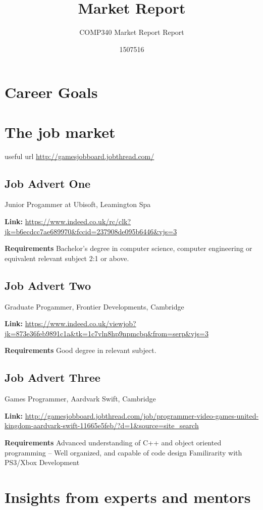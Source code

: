\documentclass{scrartcl}
\title{Market Report}
\subtitle{COMP340 Market Report Report}
\author{1507516}
\begin{document}
\maketitle


\section{Career Goals}


\section{The job market}


useful url \url{http://gamesjobboard.jobthread.com/}
\subsection{Job Advert One}
Junior Progammer at Ubisoft, Leamington Spa

\textbf{Link: }
\url{https://www.indeed.co.uk/rc/clk?jk=b6ecdcc7ae689970&fccid=237908de095b6446&vjs=3}

\textbf{Requirements}
Bachelor's degree in computer science, computer engineering or equivalent relevant subject 2:1 or above.

\subsection{Job Advert Two}
Graduate Progammer, Frontier Developments, Cambridge

\textbf{Link: }
\url{https://www.indeed.co.uk/viewjob?jk=873e36feb9891c1a&tk=1c7vln8hp9npmcbq&from=serp&vjs=3}

\textbf{Requirements}
Good degree in relevant subject.

\subsection{Job Advert Three}
Games Programmer, Aardvark Swift, Cambridge

\textbf{Link:}
\url{http://gamesjobboard.jobthread.com/job/programmer-video-games-united-kingdom-aardvark-swift-11665e5feb/?d=1&source=site_search}


\textbf{Requirements}
Advanced understanding of C++ and object oriented programming
– Well organized, and capable of code design
Familirarity with PS3/Xbox Development


\section{Insights from experts and mentors}
\end{document}

